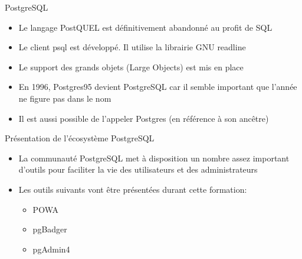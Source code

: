 
\begin{frame}[fragile]{PostgreSQL}

   \begin{itemize}
      \item Le langage PostQUEL est définitivement abandonné au profit de SQL
      \item Le client psql est développé. Il utilise la librairie GNU readline
      \item Le support des grands objets (Large Objects) est mis en place
      \item En 1996, Postgres95 devient PostgreSQL car il semble important que l'année ne figure pas dans le nom
      \item Il est aussi possible de l'appeler Postgres (en référence à son ancêtre)
   \end{itemize}

\end{frame}


\begin{frame}{Présentation de l'écosystème PostgreSQL}

   \begin{itemize}
      \item La communauté PostgreSQL met à disposition un nombre assez important d'outils pour faciliter la vie des utilisateurs et des administrateurs
      \item Les outils suivants vont être présentées durant cette formation:
      \begin{itemize}
         \item POWA
         \item pgBadger
         \item pgAdmin4
      \end{itemize}
   \end{itemize}


\end{frame}



